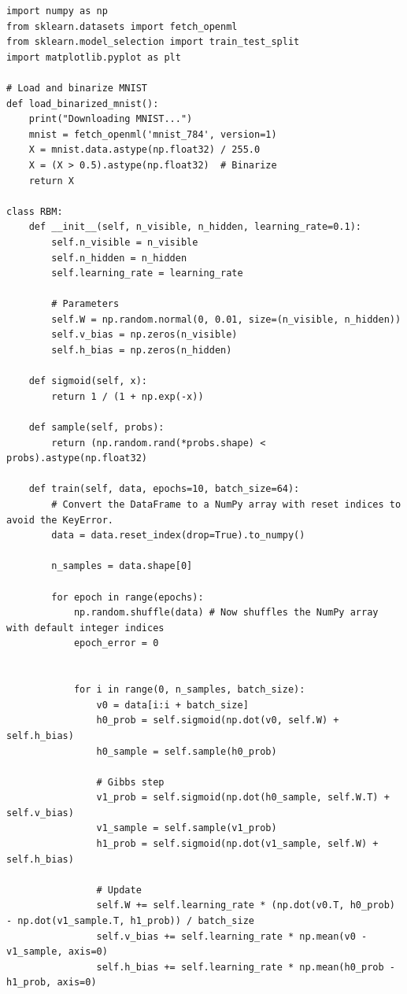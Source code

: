 \documentclass[%
oneside,                 %
final,                   %
10pt]{article}
\begin{document}
\begin{verbatim}
import numpy as np
from sklearn.datasets import fetch_openml
from sklearn.model_selection import train_test_split
import matplotlib.pyplot as plt

# Load and binarize MNIST
def load_binarized_mnist():
    print("Downloading MNIST...")
    mnist = fetch_openml('mnist_784', version=1)
    X = mnist.data.astype(np.float32) / 255.0
    X = (X > 0.5).astype(np.float32)  # Binarize
    return X

class RBM:
    def __init__(self, n_visible, n_hidden, learning_rate=0.1):
        self.n_visible = n_visible
        self.n_hidden = n_hidden
        self.learning_rate = learning_rate

        # Parameters
        self.W = np.random.normal(0, 0.01, size=(n_visible, n_hidden))
        self.v_bias = np.zeros(n_visible)
        self.h_bias = np.zeros(n_hidden)

    def sigmoid(self, x):
        return 1 / (1 + np.exp(-x))

    def sample(self, probs):
        return (np.random.rand(*probs.shape) < probs).astype(np.float32)

    def train(self, data, epochs=10, batch_size=64):
        # Convert the DataFrame to a NumPy array with reset indices to avoid the KeyError.
        data = data.reset_index(drop=True).to_numpy() 
        
        n_samples = data.shape[0]

        for epoch in range(epochs):
            np.random.shuffle(data) # Now shuffles the NumPy array with default integer indices
            epoch_error = 0
    

            for i in range(0, n_samples, batch_size):
                v0 = data[i:i + batch_size]
                h0_prob = self.sigmoid(np.dot(v0, self.W) + self.h_bias)
                h0_sample = self.sample(h0_prob)

                # Gibbs step
                v1_prob = self.sigmoid(np.dot(h0_sample, self.W.T) + self.v_bias)
                v1_sample = self.sample(v1_prob)
                h1_prob = self.sigmoid(np.dot(v1_sample, self.W) + self.h_bias)

                # Update
                self.W += self.learning_rate * (np.dot(v0.T, h0_prob) - np.dot(v1_sample.T, h1_prob)) / batch_size
                self.v_bias += self.learning_rate * np.mean(v0 - v1_sample, axis=0)
                self.h_bias += self.learning_rate * np.mean(h0_prob - h1_prob, axis=0)


\end{verbatim}
\end{document}
